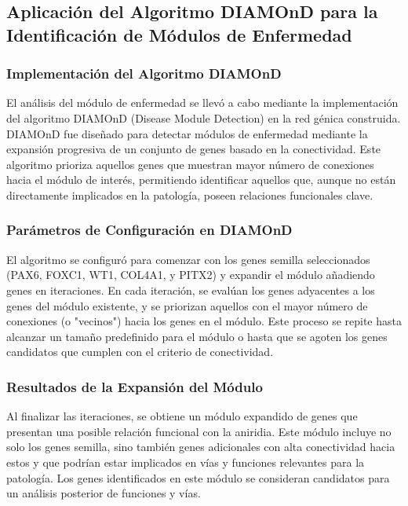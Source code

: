 \subsection{Aplicación del Algoritmo DIAMOnD para la Identificación de Módulos de Enfermedad}
\subsubsection{Implementación del Algoritmo DIAMOnD}

El análisis del módulo de enfermedad se llevó a cabo mediante la implementación del algoritmo DIAMOnD (Disease Module Detection) en la red génica construida. DIAMOnD fue diseñado para detectar módulos de enfermedad mediante la expansión progresiva de un conjunto de genes basado en la conectividad. Este algoritmo prioriza aquellos genes que muestran mayor número de conexiones hacia el módulo de interés, permitiendo identificar aquellos que, aunque no están directamente implicados en la patología, poseen relaciones funcionales clave.

\subsubsection{Parámetros de Configuración en DIAMOnD}

El algoritmo se configuró para comenzar con los genes semilla seleccionados (PAX6, FOXC1, WT1, COL4A1, y PITX2) y expandir el módulo añadiendo genes en iteraciones. En cada iteración, se evalúan los genes adyacentes a los genes del módulo existente, y se priorizan aquellos con el mayor número de conexiones (o "vecinos") hacia los genes en el módulo. Este proceso se repite hasta alcanzar un tamaño predefinido para el módulo o hasta que se agoten los genes candidatos que cumplen con el criterio de conectividad.

\subsubsection{Resultados de la Expansión del Módulo}

Al finalizar las iteraciones, se obtiene un módulo expandido de genes que presentan una posible relación funcional con la aniridia. Este módulo incluye no solo los genes semilla, sino también genes adicionales con alta conectividad hacia estos y que podrían estar implicados en vías y funciones relevantes para la patología. Los genes identificados en este módulo se consideran candidatos para un análisis posterior de funciones y vías.

